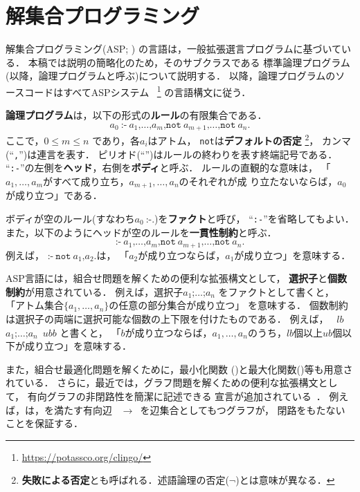 ﻿%
\section{解集合プログラミング}\label{chap:asp}

解集合プログラミング(ASP; \cite{%
  Baral03:cambridge,%
  Gelfond88:iclp,%
  Inoue08:jssst,%
  Niemela99:amai})
の言語は，一般拡張選言プログラムに基づいている．
本稿では説明の簡略化のため，そのサブクラスである
標準論理プログラム(以降，論理プログラムと呼ぶ)について説明する．
以降，論理プログラムのソースコードはすべてASPシステム
{\clingo}~\footnote{\url{https://potassco.org/clingo/}}
の言語構文に従う．

\textbf{論理プログラム}は，以下の形式の\textbf{ルール}の有限集合である．
\[
  a_0\ \texttt{:-}\
  a_1\texttt{,}\dots\texttt{,}a_m\texttt{,}
  \texttt{not}\ {a_{m+1}}\texttt{,}\dots\texttt{,}\texttt{not}\ {a_n}\texttt{.}
\]
ここで，$0\leq m\leq n$ であり，各$a_i$はアトム，
\texttt{not}は\textbf{デフォルトの否定}
\footnote{\textbf{失敗による否定}とも呼ばれる．述語論理の否定($\neg$)とは意味が異なる．}，
カンマ(``\texttt{,}'')は連言を表す．
ピリオド(``'')はルールの終わりを表す終端記号である．
``\texttt{:-}''の左側を\textbf{ヘッド}，右側を\textbf{ボディ}と呼ぶ．
ルールの直観的な意味は，
「$a_1,\ldots,a_m$がすべて成り立ち，$a_{m+1},\ldots,a_n$のそれぞれが成
り立たないならば，$a_0$が成り立つ」である．

ボディが空のルール(すなわち\(a_0\ \texttt{:-.}\))を\textbf{ファクト}と呼び，
``\texttt{:-}''を省略してもよい．
また，以下のようにヘッドが空のルールを\textbf{一貫性制約}と呼ぶ．
\[
  \texttt{:-} \ a_1\texttt{,}\dots\texttt{,}a_m\texttt{,}
  \texttt{not}\ {a_{m+1}}\texttt{,}\dots\texttt{,}\texttt{not}\ {a_n}\texttt{.}
\]
例えば，
\(\texttt{:-}\ \texttt{not}\ a_1\texttt{,} {a_{2}}\texttt{.}\)は，
「$a_2$が成り立つならば，$a_1$が成り立つ」を意味する．

ASP言語には，組合せ問題を解くための便利な拡張構文として，
\textbf{選択子}と\textbf{個数制約}が用意されている．
例えば，選択子\code{\{}\(a_1\texttt{;}\dots\texttt{;}a_n\)\code{\}}
をファクトとして書くと，
「アトム集合\(\{a_1,\dots,a_n\}\)の任意の部分集合が成り立つ」
を意味する．
個数制約は選択子の両端に選択可能な個数の上下限を付けたものである．
例えば，
\ $lb$\ \code{\{}\(a_1\texttt{;}\dots\texttt{;}a_n\)\code{\}}\ $ub$\code{,}$b$
と書くと，
「$b$が成り立つならば，$a_1,\dots,a_n$のうち，$lb$個以上$ub$個以下が成り立つ」を意味する．

また，組合せ最適化問題を解くために，最小化関数
()と最大化関数()等も用意されている．
さらに，最近では，グラフ問題を解くための便利な拡張構文として，
有向グラフの非閉路性を簡潔に記述できる
宣言が追加されている~\cite{bomanson16:acyclicity}．
例えば，は，を満たす有向辺
~$\rightarrow$~を辺集合としてもつグラフが，
閉路をもたないことを保証する．


